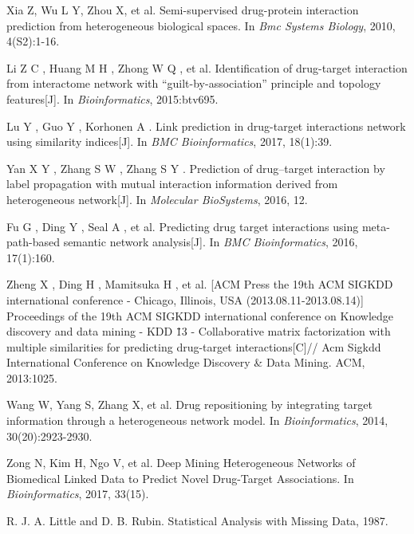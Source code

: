 \documentclass[journal]{IEEEtran}
\begin{document}
\begin{thebibliography}{10}
Xia Z, Wu L Y, Zhou X, et al. 
\newblock Semi-supervised drug-protein interaction prediction from heterogeneous biological spaces. 
\newblock In {\em Bmc Systems Biology}, 2010, 4(S2):1-16.



Li Z C , Huang M H , Zhong W Q , et al. 
\newblock Identification of drug-target interaction from interactome network with “guilt-by-association” principle and topology features[J]. 
\newblock In {\em Bioinformatics}, 2015:btv695.


Lu Y , Guo Y , Korhonen A . 
\newblock Link prediction in drug-target interactions network using similarity indices[J]. 
\newblock In {\em BMC Bioinformatics}, 2017, 18(1):39.

Yan X Y , Zhang S W , Zhang S Y . 
\newblock Prediction of drug–target interaction by label propagation with mutual interaction information derived from heterogeneous network[J]. 
\newblock In {\em Molecular BioSystems}, 2016, 12.


Fu G , Ding Y , Seal A , et al. 
\newblock Predicting drug target interactions using meta-path-based semantic network analysis[J]. 
\newblock In {\em BMC Bioinformatics}, 2016, 17(1):160.

Zheng X , Ding H , Mamitsuka H , et al. [ACM Press the 19th ACM SIGKDD international conference - Chicago, Illinois, USA (2013.08.11-2013.08.14)] Proceedings of the 19th ACM SIGKDD international conference on Knowledge discovery and data mining - KDD \"13 - Collaborative matrix factorization with multiple similarities for predicting drug-target interactions[C]// Acm Sigkdd International Conference on Knowledge Discovery & Data Mining. ACM, 2013:1025.


Wang W, Yang S, Zhang X, et al. 
\newblock Drug repositioning by integrating target information through a heterogeneous network model. 
\newblock In {\em Bioinformatics}, 2014, 30(20):2923-2930.



Zong N, Kim H, Ngo V, et al. 
\newblock Deep Mining Heterogeneous Networks of Biomedical Linked Data to Predict Novel Drug-Target Associations. 
\newblock In {\em Bioinformatics}, 2017, 33(15).



R. J. A. Little and D. B. Rubin.
\newblock Statistical Analysis with Missing Data, 1987.


\end{thebibliography}
\end{document}
